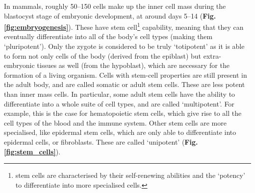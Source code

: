 In mammals, roughly 50–150 cells make up the inner cell mass during the blastocyst stage of embryonic development, at around days 5–14 (\textbf{Fig. \ref{fig:embryogenesis}}). 
These have stem cell\footnote{stem cells are characterised by their self-renewing abilities and the `potency' to differentiate into more specialised cells.} capability, meaning that they can eventually differentiate into all of the body's cell types (making them `pluripotent').
Only the zygote is considered to be truly `totipotent' as it is able to form not only cells of the body (derived from the epiblast) but extra-embryonic tissues as well (from the hypoblast), which are necessary for the formation of a living organism.
Cells with stem-cell properties are still present in the adult body, and are called somatic or adult stem cells.
These are less 
potent
than inner mass cells.
In particular, some adult stem cells have the ability to differentiate into a whole suite of cell types, and are called `multipotent'.
For example, this is the case for hematopoietic stem cells, which give rise to all the cell types of the blood and the immune system.
Other stem cells are more specialised, like epidermal stem cells, which are only able to differentiate into epidermal cells, or fibroblasts.
These are called `unipotent' (\textbf{Fig. \ref{fig:stem_cells}}).\\

